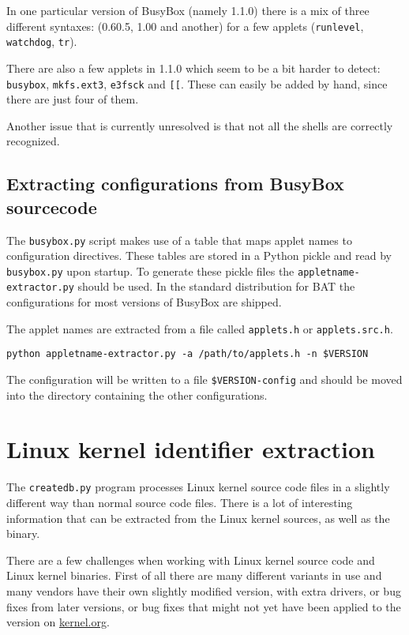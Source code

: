 \documentclass[10pt,a4paper]{article}
\begin{document}
In one particular version of BusyBox (namely 1.1.0) there is a mix of three
different syntaxes: (0.60.5, 1.00 and another) for a few applets
(\texttt{runlevel}, \texttt{watchdog}, \texttt{tr}).

There are also a few applets in 1.1.0 which seem to be a bit harder to detect:
\texttt{busybox}, \texttt{mkfs.ext3}, \texttt{e3fsck} and \texttt{[[}. These
can easily be added by hand, since there are just four of them.

Another issue that is currently unresolved is that not all the shells are
correctly recognized.

\subsection{Extracting configurations from BusyBox sourcecode}

The \texttt{busybox.py} script makes use of a table that maps applet names to
configuration directives. These tables are stored in a Python pickle and read
by \texttt{busybox.py} upon startup. To generate these pickle files the
\texttt{appletname-extractor.py} should be used. In the standard distribution
for BAT the configurations for most versions of BusyBox are shipped.

The applet names are extracted from a file called \texttt{applets.h} or
\texttt{applets.src.h}.

\begin{verbatim}
python appletname-extractor.py -a /path/to/applets.h -n $VERSION
\end{verbatim}

The configuration will be written to a file \texttt{\$VERSION-config} and
should be moved into the directory containing the other configurations.

\section{Linux kernel identifier extraction}

The \texttt{createdb.py} program processes Linux kernel source code files in a
slightly different way than normal source code files. There is a lot of
interesting information that can be extracted from the Linux kernel sources,
as well as the binary.

There are a few challenges when working with Linux kernel source code and Linux
kernel binaries. First of all there are many different variants in use and many
vendors have their own slightly modified version, with extra drivers, or bug
fixes from later versions, or bug fixes that might not yet have been applied to
the version on \url{kernel.org}.
\end{document}
